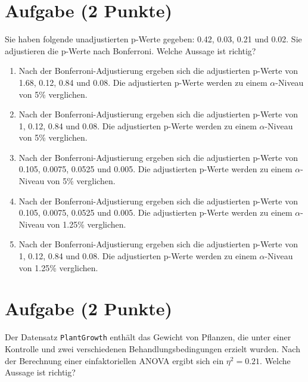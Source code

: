 \documentclass[a4paper, 10pt]{scrartcl}\usepackage[]{graphicx}\usepackage[]{xcolor}
\begin{document}
\section{Aufgabe \hfill (2 Punkte)}



Sie haben folgende unadjustierten p-Werte gegeben: 0.42, 0.03, 0.21 und 0.02. Sie adjustieren die p-Werte nach
Bonferroni. Welche Aussage ist richtig?



\begin{enumerate}
\item [\textbf{A} \msquare] Nach der Bonferroni-Adjustierung ergeben sich die adjustierten p-Werte von 1.68, 0.12, 0.84 und 0.08. Die adjustierten p-Werte werden zu einem $\alpha$-Niveau von 5\% verglichen.
\item [\textbf{B} \msquare] Nach der Bonferroni-Adjustierung ergeben sich die adjustierten p-Werte von 1, 0.12, 0.84 und 0.08. Die adjustierten p-Werte werden zu einem $\alpha$-Niveau von 5\% verglichen.
\item [\textbf{C} \msquare] Nach der Bonferroni-Adjustierung ergeben sich die adjustierten p-Werte von 0.105, 0.0075, 0.0525 und 0.005. Die adjustierten p-Werte werden zu einem $\alpha$-Niveau von 5\% verglichen.
\item [\textbf{D} \msquare] Nach der Bonferroni-Adjustierung ergeben sich die adjustierten p-Werte von 0.105, 0.0075, 0.0525 und 0.005. Die adjustierten p-Werte werden zu einem $\alpha$-Niveau von 1.25\% verglichen.
\item [\textbf{E} \msquare] Nach der Bonferroni-Adjustierung ergeben sich die adjustierten p-Werte von 1, 0.12, 0.84 und 0.08. Die adjustierten p-Werte werden zu einem $\alpha$-Niveau von 1.25\% verglichen.
\end{enumerate} 

\section{Aufgabe \hfill (2 Punkte)}



Der Datensatz \texttt{PlantGrowth} enth{\"a}lt das Gewicht von Pflanzen, die
unter einer Kontrolle und zwei verschiedenen Behandlungsbedingungen erzielt
wurden. Nach der Berechnung einer einfaktoriellen ANOVA ergibt sich ein
$\eta^2 = 0.21$. Welche Aussage ist richtig?
\end{document}
